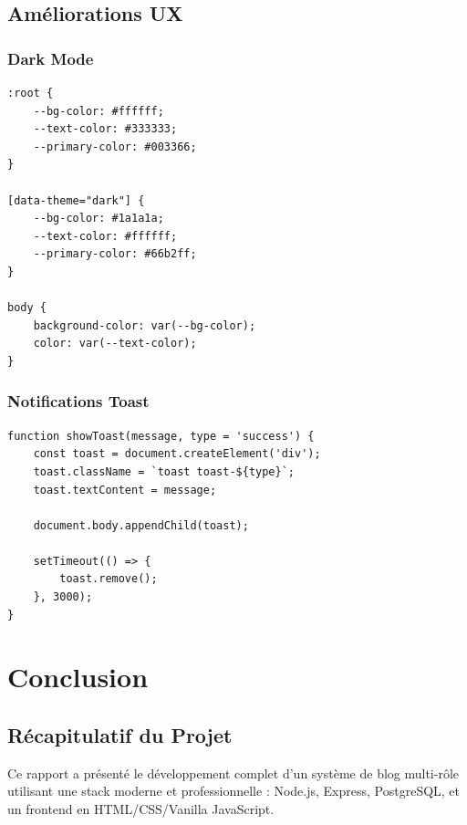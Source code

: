 \section{Améliorations UX}

\subsection{Dark Mode}

\begin{lstlisting}[style=css, caption=Dark mode avec CSS variables]
:root {
    --bg-color: #ffffff;
    --text-color: #333333;
    --primary-color: #003366;
}

[data-theme="dark"] {
    --bg-color: #1a1a1a;
    --text-color: #ffffff;
    --primary-color: #66b2ff;
}

body {
    background-color: var(--bg-color);
    color: var(--text-color);
}
\end{lstlisting}

\subsection{Notifications Toast}

\begin{lstlisting}[style=javascript, caption=Système de notifications toast]
function showToast(message, type = 'success') {
    const toast = document.createElement('div');
    toast.className = `toast toast-${type}`;
    toast.textContent = message;
    
    document.body.appendChild(toast);
    
    setTimeout(() => {
        toast.remove();
    }, 3000);
}
\end{lstlisting}

\chapter{Conclusion}

\section{Récapitulatif du Projet}

Ce rapport a présenté le développement complet d'un système de blog multi-rôle utilisant une stack moderne et professionnelle : Node.js, Express, PostgreSQL, et un frontend en HTML/CSS/Vanilla JavaScript.

